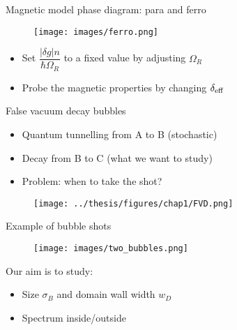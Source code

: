 \documentclass[aspectratio=169]{beamer}
\begin{document}
\begin{frame}{Magnetic model phase diagram: para and ferro}
  \begin{minipage}{0.7\textwidth}
    \begin{figure}
      \centering
      \texttt{[image: images/ferro.png]}
    \end{figure} 
  \end{minipage}
  \hspace{0.01\textwidth}
  \begin{minipage}{0.27\textwidth}
    \begin{itemize}
      \item Set $\dfrac{|\delta g| n}{\hbar\Omega_R}$ to a fixed value by adjusting $\Omega_R$
      \item Probe the magnetic properties by changing $\delta_{\rm eff}$
    \end{itemize}
  \end{minipage}
\end{frame} 

\begin{frame}{False vacuum decay bubbles}
  \begin{minipage}{0.32\textwidth}
    \begin{itemize}
      \item Quantum tunnelling from A to B (stochastic)
      \item Decay from B to C (what we want to study)
      \item Problem: when to take the shot?
    \end{itemize}
  \end{minipage}
  \hspace{0.01\textwidth}
  \begin{minipage}{0.65\textwidth}
    \begin{figure}
      \centering
      \texttt{[image: ../thesis/figures/chap1/FVD.png]}
    \end{figure} 
  \end{minipage}
\end{frame}

\begin{frame}{Example of bubble shots}
  \begin{figure}
    \centering
    \texttt{[image: images/two\_bubbles.png]}
  \end{figure}
  Our aim is to study:
  \begin{itemize}
    \item Size $\sigma_B$ and domain wall width $w_D$
    \item Spectrum inside/outside
  \end{itemize}
\end{frame}
\end{document}
